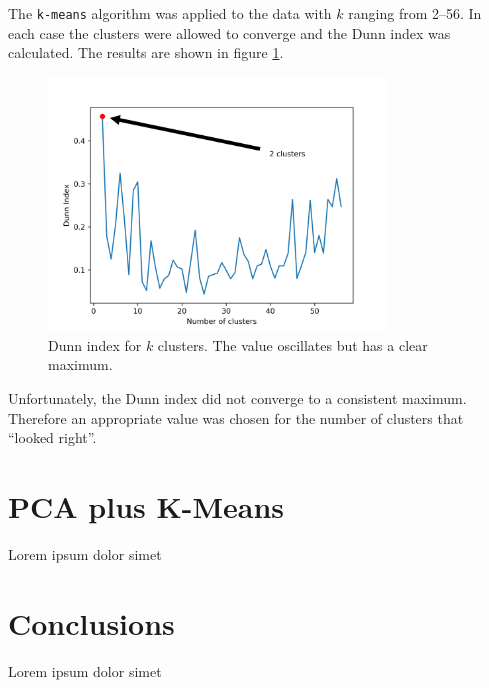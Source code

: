 \documentclass{article}
\begin{document}
	The \texttt{k-means} algorithm was applied to the data with $k$ ranging from \numrange{2}{56}. In each 
	case the clusters were allowed to converge and the Dunn index was calculated. The results are shown 
	in figure \ref{fig:dunn_index_raw_data}.
	
	\begin{figure}[h]
		\centering
		\includegraphics[width=0.8\textwidth]{dunn_index_raw_data}
		\caption{Dunn index for $k$ clusters. The value oscillates but has a clear maximum.}
		\label{fig:dunn_index_raw_data}
	\end{figure}
	
	Unfortunately, the Dunn index did not converge to a consistent maximum. Therefore an appropriate value 
	was chosen for the number of clusters that ``looked right''.
	
	
	
	\section{PCA plus K-Means}
	Lorem ipsum dolor simet \cite{Yeung2000}
	
	\section{Conclusions}
	Lorem ipsum dolor simet
		
	\printbibliography
\end{document}
